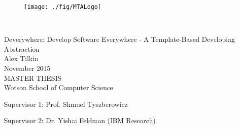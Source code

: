 \thispagestyle{empty}

\begin{figure}
\centering
\texttt{[image: ./fig/MTALogo]}
\end{figure}

\mbox{}\\[6pc]
\begin{center}
\Huge{Deverywhere: Develop Software Everywhere - A Template-Based Developing Abstraction}\\[2pc]

\Large{Alex Tilkin}\\[1pc]
\large{November 2015}\\[2pc]

MASTER THESIS\\
Wotson School of Computer Science\\
\end{center}
\vfill

\noindent Supervisor 1: Prof. Shmuel Tyszberowicz

\noindent Supervisor 2: Dr. Yishai Feldman (IBM Research)

